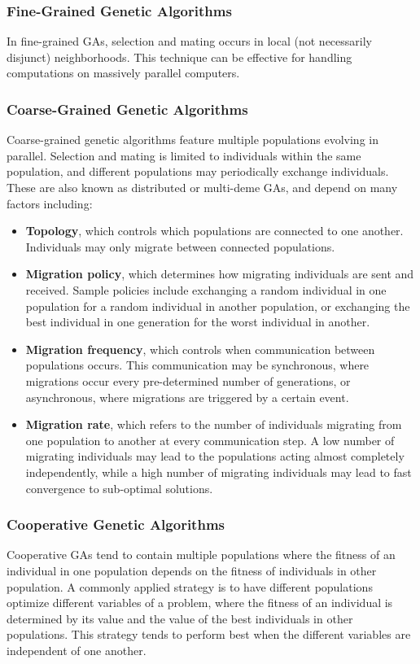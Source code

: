 \documentclass[12pt,titlepage]{article}
\begin{document}
      \subsubsection{Fine-Grained Genetic Algorithms}
        In fine-grained GAs, selection and mating occurs in local (not necessarily disjunct) neighborhoods. This technique can be effective for handling
        computations on massively parallel computers.

      \subsubsection{Coarse-Grained Genetic Algorithms}
        Coarse-grained genetic algorithms feature multiple populations evolving in parallel. Selection and mating is limited to individuals within the
        same population, and different populations may periodically exchange individuals. These are also known as distributed or multi-deme GAs, and
        depend on many factors including:
        \begin{itemize}
          \item \textbf{Topology}, which controls which populations are connected to one another. Individuals may only migrate between connected populations.
          \item \textbf{Migration policy}, which determines how migrating individuals are sent and received. Sample policies include exchanging a random
            individual in one population for a random individual in another population, or exchanging the best individual in one generation for the worst
            individual in another.
          \item \textbf{Migration frequency}, which controls when communication between populations occurs. This communication may be synchronous, where
            migrations occur every pre-determined number of generations, or asynchronous, where migrations are triggered by a certain event.
          \item \textbf{Migration rate}, which refers to the number of individuals migrating from one population to another at every communication step.
            A low number of migrating individuals may lead to the populations acting almost completely independently, while a high number of migrating
            individuals may lead to fast convergence to sub-optimal solutions.
        \end{itemize}

      \subsubsection{Cooperative Genetic Algorithms}
        Cooperative GAs tend to contain multiple populations where the fitness of an individual in one population depends on the fitness of individuals
        in other population. A commonly applied strategy is to have different populations optimize different variables of a problem, where the fitness
        of an individual is determined by its value and the value of the best individuals in other populations. This strategy tends to perform best when
        the different variables are independent of one another.
\end{document}
